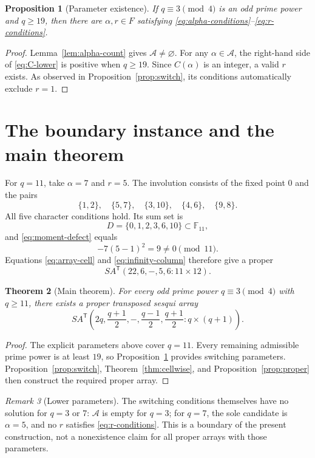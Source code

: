 \documentclass[11pt]{article}
\newtheorem{theorem}{Theorem}[section]
\newtheorem{proposition}[theorem]{Proposition}
\theoremstyle{definition}
\theoremstyle{remark}
\newtheorem{remark}[theorem]{Remark}
\newcommand{\F}{\mathbb F}
\newcommand{\SA}{SA^{\mathsf T}}
\newcommand{\calA}{\mathcal A}
\begin{document}
\begin{proposition}[Parameter existence]
\label{prop:parameter-existence}
If \(q\equiv3\pmod4\) is an odd prime power and \(q\geq19\), then there are
\(\alpha,r\in F\) satisfying
\eqref{eq:alpha-conditions}--\eqref{eq:r-conditions}.
\end{proposition}

\begin{proof}
Lemma~\ref{lem:alpha-count} gives \(\calA\ne\varnothing\).  For any
\(\alpha\in\calA\), the right-hand side of \eqref{eq:C-lower} is positive
when \(q\geq19\).  Since \(C(\alpha)\) is an integer, a valid \(r\) exists.
As observed in Proposition~\ref{prop:switch}, its conditions automatically
exclude \(r=1\).
\end{proof}

\section{The boundary instance and the main theorem}
For \(q=11\), take \(\alpha=7\) and \(r=5\).  The involution consists of the
fixed point \(0\) and the pairs
\[
 \{1,2\},\quad\{5,7\},\quad\{3,10\},\quad\{4,6\},\quad\{9,8\}.
\]
All five character conditions hold.  Its sum set is
\begin{equation}
 D=\{0,1,2,3,6,10\}\subset\F_{11},
 \label{eq:q11-D}
\end{equation}
and \eqref{eq:moment-defect} equals
\[
 -7(5-1)^2=9\ne0\pmod{11}.
\]
Equations \eqref{eq:array-cell} and \eqref{eq:infinity-column} therefore give
a proper
\[
 \SA(22,6,-,5,6:11\times12).
\]

\begin{theorem}[Main theorem]
\label{thm:main}
For every odd prime power \(q\equiv3\pmod4\) with \(q\geq11\), there exists
a proper transposed sesqui array
\[
 \SA\!\left(
 2q,\frac{q+1}{2},-,\frac{q-1}{2},\frac{q+1}{2}:q\times(q+1)
 \right).
\]
\end{theorem}

\begin{proof}
The explicit parameters above cover \(q=11\).  Every remaining admissible
prime power is at least \(19\), so Proposition~\ref{prop:parameter-existence}
provides switching parameters.  Proposition~\ref{prop:switch},
Theorem~\ref{thm:cellwise}, and Proposition~\ref{prop:proper} then construct
the required proper array.
\end{proof}

\begin{remark}[Lower parameters]
The switching conditions themselves have no solution for \(q=3\) or \(7\):
\(\calA\) is empty for \(q=3\); for \(q=7\), the sole candidate is
\(\alpha=5\), and no \(r\) satisfies \eqref{eq:r-conditions}.  This is a
boundary of the present construction, not a nonexistence claim for all
proper arrays with those parameters.
\end{remark}
\end{document}

